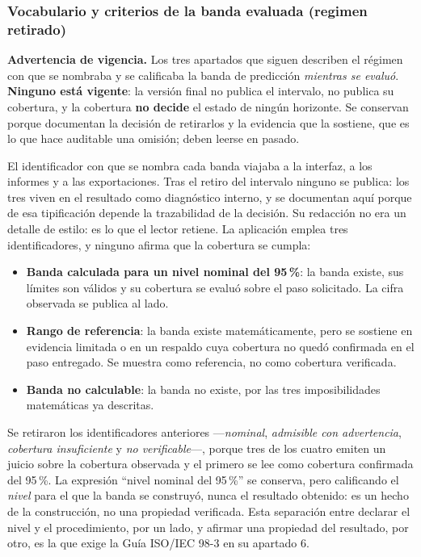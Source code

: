 \documentclass[12pt,letterpaper]{article}
\begin{document}
\subsubsection*{Vocabulario y criterios de la banda evaluada (regimen retirado)}

\textbf{Advertencia de vigencia.} Los tres apartados que siguen describen el régimen con que se nombraba y se calificaba la banda de predicción \emph{mientras se evaluó}. \textbf{Ninguno está vigente}: la versión final no publica el intervalo, no publica su cobertura, y la cobertura \textbf{no decide} el estado de ningún horizonte. Se conservan porque documentan la decisión de retirarlos y la evidencia que la sostiene, que es lo que hace auditable una omisión; deben leerse en pasado.

El identificador con que se nombra cada banda viajaba a la interfaz, a los informes y a las exportaciones. Tras el retiro del intervalo ninguno se publica: los tres viven en el resultado como diagnóstico interno, y se documentan aquí porque de esa tipificación depende la trazabilidad de la decisión. Su redacción no era un detalle de estilo: es lo que el lector retiene. La aplicación emplea tres identificadores, y ninguno afirma que la cobertura se cumpla:

\begin{itemize}
  \item \textbf{Banda calculada para un nivel nominal del 95\,\%}: la banda existe, sus límites son válidos y su cobertura se evaluó sobre el paso solicitado. La cifra observada se publica al lado.
  \item \textbf{Rango de referencia}: la banda existe matemáticamente, pero se sostiene en evidencia limitada o en un respaldo cuya cobertura no quedó confirmada en el paso entregado. Se muestra como referencia, no como cobertura verificada.
  \item \textbf{Banda no calculable}: la banda no existe, por las tres imposibilidades matemáticas ya descritas.
\end{itemize}

Se retiraron los identificadores anteriores ---\emph{nominal}, \emph{admisible con advertencia}, \emph{cobertura insuficiente} y \emph{no verificable}---, porque tres de los cuatro emiten un juicio sobre la cobertura observada y el primero se lee como cobertura confirmada del 95\,\%. La expresión ``nivel nominal del 95\,\%'' se conserva, pero calificando el \emph{nivel} para el que la banda se construyó, nunca el resultado obtenido: es un hecho de la construcción, no una propiedad verificada. Esta separación entre declarar el nivel y el procedimiento, por un lado, y afirmar una propiedad del resultado, por otro, es la que exige la Guía ISO/IEC 98-3 en su apartado 6.
\end{document}
